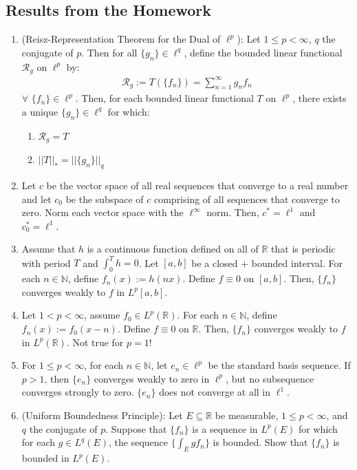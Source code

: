 \documentclass[11pt]{article}
\theoremstyle{definition}
\theoremstyle{definition}
\newcommand{\R}[0]{\mathbb{R}}
\newcommand{\N}[0]{\mathbb{N}}
\newcommand{\idx}[2]{\int_{#1}^{#2}}
\theoremstyle{definition}
\theoremstyle{remark}
\begin{document}
\subsection{Results from the Homework}
\begin{enumerate}
	\item (Reisz-Representation Theorem for the Dual of $\ell^p$): Let $1 \leq p < \infty$, $q$ the conjugate of $p$. Then for all $\{ g_n \} \in \ell^q$, define the bounded linear functional $\mathcal{R}_g$ on $\ell^p$ by: 
	\begin{align}
		\mathcal{R}_g := T ( \{ f_n \}) = \sum_{n=1}^\infty g_n f_n 	
	\end{align}
 	$\forall$ $\{ f_n \} \in \ell^p$. Then, for each bounded linear functional $T$ on $\ell^p$, there exists a unique $\{ g_n \} \in \ell^q$ for which: 
 	\begin{enumerate}[noitemsep]
 		\item $\mathcal{R}_g = T$
 		\item $||T||_* = || \{ g_n \} ||_q$ 
 	\end{enumerate}
 	\item Let $c$ be the vector space of all real sequences that converge to a real number and let $c_0$ be the subspace of $c$ comprising of all sequences that converge to zero. Norm each vector space with the $\ell^\infty$ norm. Then, $c^* = \ell^1$ and $c_0^* = \ell^1$. 
 	\item Assume that $h$ is a continuous function defined on all of $\R$ that is periodic with period $T$ and $\idx{0}{T}h =0$. Let $[a,b]$ be a closed + bounded interval. For each $n \in \N$, define $f_n(x) := h(nx)$. Define $f \equiv 0$ on $[a,b]$. Then, $\{ f_n \} $ converges weakly to $f$ in $L^p[a,b]$. 
 	\item Let $1 < p < \infty$, assume $f_0 \in L^p( \R)$. For each $n \in \N$, define $f_n(x) := f_0 (x-n)$. Define $f \equiv 0$ on $\R$. Then, $\{ f_n \}$ converges weakly to $f$ in $L^p(\R)$. Not true for $p=1$!
 	\item For $1 \leq p < \infty$, for each $n \in \N$, let $e_n \in \ell^p$ be the standard basis sequence. If $p > 1$, then $\{ e_n \}$ converges weakly to zero in $\ell^p$, but no subsequence converges strongly to zero. $\{ e_n \}$ does not converge at all in $\ell^1$. 
 	\item (Uniform Boundedness Principle): Let $E \subseteq \R$ be measurable, $1 \leq p < \infty$, and $q$ the conjugate of $p$. Suppose that $\{ f_n \}$ is a sequence in $L^p(E)$ for which for each $g \in L^q(E)$, the sequence $\{ \idx{E}{} g f_n \}$ is bounded. Show that $\{ f_n \}$ is bounded in $L^p(E)$. 

\end{enumerate}
\end{document}

